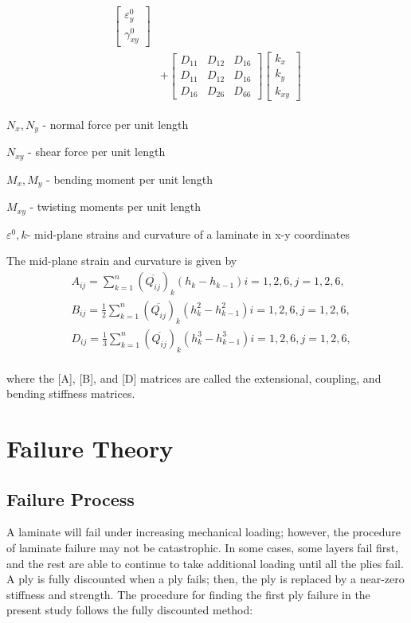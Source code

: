 \begin{equation}
\begin{array}{l}
\begin{aligned}
\begin{bmatrix}
        \varepsilon_y^0 \\
		\gamma_{xy}^0
    \end{bmatrix} \\ 
	&+  
	\begin{bmatrix}
		D_{11} & D_{12} & D_{16} \\
		D_{11} & D_{12} & D_{16} \\
		D_{16} & D_{26} & D_{66} 
	\end{bmatrix}
	\begin{bmatrix}
		k_x \\
		k_y \\
		k_{xy} 
	\end{bmatrix}
\end{aligned}
	\end{array}
\end{equation}


$N_x,N_y $  - normal force per unit length

$N_{xy} $  - shear force per unit length

$M_x, M_y $ - bending moment per unit length

$M_{xy} $  - twisting moments per unit length

$\varepsilon^{0}, k $- mid-plane strains and curvature of a laminate in x-y coordinates

The mid-plane strain and curvature is given by
\begin{equation}
    \begin{split}
	&A_{ij}=\sum_{k=1}^{n}(\overline{Q_{ij}})_k(h_k-h_{k-1})  i=1,2,6, j=1,2,6 \textstyle{,}\\
	&B_{ij}=\frac{1}{2}\sum_{k=1}^{n}(\overline{Q_{ij}})_k(h^2_k - h_{k-1}^2)  i=1,2,6, j=1,2,6 \textstyle{,}\\
	&D_{ij}=\frac{1}{3}\sum_{k=1}^{n}(\overline{Q_{ij}})_k(h^3_k - h_{k-1}^3) i=1,2,6, j=1,2,6 \textstyle{,}\\
    \end{split}
\end{equation}

where the [A], [B], and [D] matrices are called the extensional, coupling, and bending stiffness matrices.

\section{Failure Theory}

\subsection{Failure Process}
A laminate will fail under increasing mechanical loading; however, the procedure of laminate failure may not
be catastrophic.
 In some cases, some layers fail first, and the rest are able to continue to take additional loading
 until all the plies fail. A ply is fully discounted when a ply fails; then, the ply is replaced
by a near-zero stiffness and strength. 
The procedure for finding the first ply failure in the present
study follows the fully discounted method:

